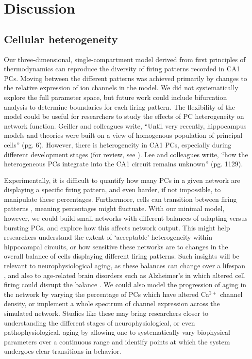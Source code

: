 \documentclass[10pt,letterpaper]{article}
\newcommand{\Ca}{Ca$^{2+}$}
\begin{document}
\section*{Discussion}

\subsection*{Cellular heterogeneity}

Our three-dimensional, single-compartment model derived from first principles of thermodynamics can reproduce the diversity of firing patterns recorded in CA1 PCs. Moving between the different patterns was achieved primarily by changes to the relative expression of ion channels in the model. We did not systematically explore the full parameter space, but future work could include bifurcation analysis to determine boundaries for each firing pattern. The flexibility of the model could be useful for researchers to study the effects of PC heterogeneity on network function. Geiller and colleagues \cite{geiller2017segregated} write, ``Until very recently, hippocampus models and theories were built on a view of homogenous population of principal cells'' (pg. 6). However, there is heterogeneity in CA1 PCs, especially during different development stages (for review, see \cite{mckiernan2017ca1}). Lee and colleagues \cite{lee2014parvalbumin} write, ``how the heterogeneous PCs integrate into the CA1 circuit remains unknown'' (pg. 1129). 

Experimentally, it is difficult to quantify how many PCs in a given network are displaying a specific firing pattern, and even harder, if not impossible, to manipulate these percentages. Furthermore, cells can transition between firing patterns \cite{steriade1998dynamic}, meaning percentages might fluctuate. With our minimal model, however, we could build small networks with different balances of adapting versus bursting PCs, and explore how this affects network output. This might help researchers understand the extent of `acceptable' heterogeneity within hippocampal circuits, or how sensitive these networks are to changes in the overall balance of cells displaying different firing patterns. Such insights will be relevant to neurophysiological aging, as these balances can change over a lifespan \cite{chen2005transitional}, and also to age-related brain disorders such as Alzheimer's in which altered cell firing could disrupt the balance \cite{frere2018alzheimer}. We could also model the progression of aging in the network by varying the percentage of PCs which have altered {\Ca} channel density, or implement a whole spectrum of channel expression across the simulated network. Studies like these may bring researchers closer to understanding the different stages of neurophysiological, or even pathophysiological, aging by allowing one to systematically vary biophysical parameters over a continuous range and identify points at which the system undergoes clear transitions in behavior.
\end{document}
